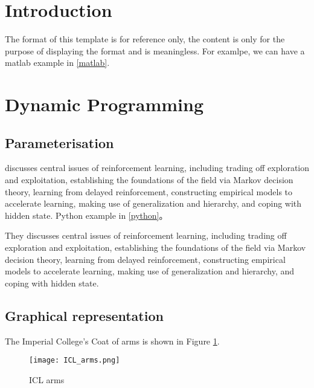 \newpage\vspace*{-21.6pt}

\section{Introduction}
The format of this template is for reference only, the content is only for the purpose of displaying the format and is meaningless. For examlpe, we can have a matlab example in \ref{matlab}.

\newpage\vspace*{-21.6pt}
\section{Dynamic Programming}
\subsection{Parameterisation}

\cite{kaelbling1996reinforcement} discusses central issues of reinforcement learning, including trading off exploration and exploitation, establishing the foundations of the field via Markov decision theory, learning from delayed reinforcement, constructing empirical models to accelerate learning, making use of generalization and hierarchy, and coping with hidden state. Python example in \ref{python}。

They \citep{kaelbling1996reinforcement} discusses central issues of reinforcement learning, including trading off exploration and exploitation, establishing the foundations of the field via Markov decision theory, learning from delayed reinforcement, constructing empirical models to accelerate learning, making use of generalization and hierarchy, and coping with hidden state.

\subsection{Graphical representation}

The Imperial College's Coat of arms is shown in Figure \ref{Arm}.

\begin{figure}[!h]
	\centering
	\texttt{[image: ICL\_arms.png]}
	\caption{ICL arms}
	\label{Arm}
\end{figure}
